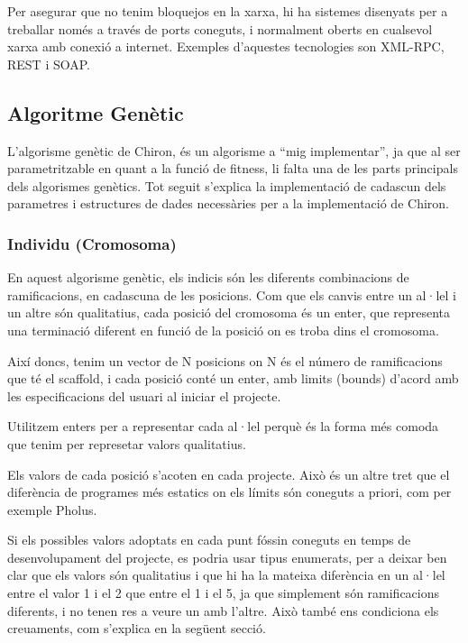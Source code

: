 \documentclass[titlepage,a4paper,12pt]{book}
\begin{document}
Per asegurar que no tenim bloquejos en la xarxa, hi ha sistemes disenyats per a
treballar només a través de ports coneguts, i normalment oberts en cualsevol
xarxa amb conexió a internet.  Exemples d'aquestes tecnologies son XML-RPC, REST
i SOAP.


\subsection{Algoritme Genètic} %
	\label{sub:Algoritme Genetic}

L'algorisme genètic de Chiron, és un algorisme a ``mig implementar'', ja que al
ser parametritzable en quant a la funció de fitness, li falta una de les parts
principals dels algorismes genètics.  Tot seguit s'explica la implementació de
cadascun dels parametres i estructures de dades necessàries per a la
implementació de Chiron.

\subsubsection{Individu (Cromosoma)}
\label{ssub:individu (cromosoma)}

En aquest algorisme genètic, els indicis són les diferents combinacions de
ramificacions, en cadascuna de les posicions. Com que els canvis entre un al·lel i un
altre són qualitatius, cada posició del cromosoma és un enter, que representa
una terminació diferent en funció de la posició on es troba dins el cromosoma.

Així doncs, tenim un vector de N posicions on N és el número de ramificacions que té
el scaffold, i cada posició conté un enter, amb limits (bounds) d'acord amb les
especificacions del usuari al iniciar el projecte. 

Utilitzem enters per a representar cada al·lel perquè és la forma més comoda que
tenim per represetar valors qualitatius.

Els valors de cada posició s'acoten en cada projecte.  Això és un
altre tret que el diferència de programes més estatics on els límits són
coneguts a priori, com per exemple Pholus.

Si els possibles valors adoptats en cada punt fóssin coneguts en temps de
desenvolupament del projecte, es podria usar tipus enumerats, per a deixar ben
clar que els valors són qualitatius i que hi ha la mateixa diferència en un
al·lel entre el valor 1 i el 2 que entre el 1 i el 5, ja que simplement són
ramificacions diferents, i no tenen res a veure un amb l'altre.  Això també ens
condiciona els creuaments, com s'explica en la següent secció.
\end{document}
